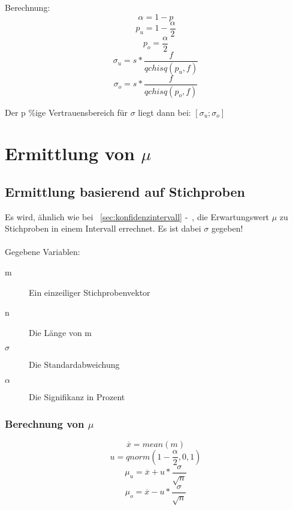 \documentclass[a4paper,10pt]{article}
\begin{document}
Berechnung:
\begin{equation}
  \alpha = 1 - p
\end{equation}
\begin{equation}
  p_u = 1 - \frac{\alpha}{2}
\end{equation}
\begin{equation}
  p_o = \frac{\alpha}{2}
\end{equation}
\begin{equation}
  \sigma_u = s * \frac{f}{qchisq(p_u , f)}
\end{equation}
\begin{equation}
  \sigma_o = s * \frac{f}{qchisq(p_o , f)}
\end{equation}

Der p \%ige Vertrauensbereich für $
\sigma $ liegt dann bei: $ [
\sigma_u ; \sigma_o] $

\section{Ermittlung von $ \mu $}
\subsection{Ermittlung basierend auf Stichproben}
\label{sec:ermittlungvonmuermittlungbasierendaufeinergrundmenge}
Es wird, ähnlich wie bei ~\autoref{sec:konfidenzintervall}
-~, die Erwartungswert $ \mu $ zu Stichproben in
einem Intervall errechnet. Es ist dabei $ \sigma $ gegeben!
\\\\
Gegebene Variablen:
\begin{description}
\item[m] Ein einzeiliger Stichprobenvektor
\item[n] Die Länge von m
\item[$ \sigma $] Die Standardabweichung
\item[$ \alpha $] Die Signifikanz in Prozent
\end{description}

\subsubsection{Berechnung von $ \mu $}
\begin{equation}
  \overline{x} = mean(m)
\end{equation}
\begin{equation}
  u = qnorm(1 - \frac{\alpha}{2}, 0, 1)
\end{equation}
\begin{equation}
  \mu_u = \overline{x} + u * \frac{\sigma}{\sqrt{n}}
\end{equation}
\begin{equation}
  \mu_o = \overline{x} - u * \frac{\sigma}{\sqrt{n}}
\end{equation}
\end{document}
